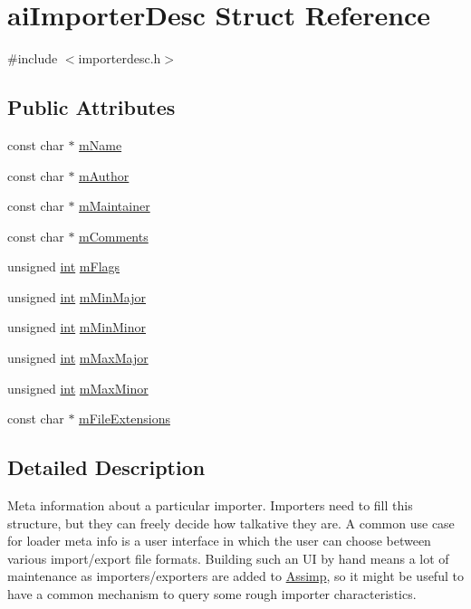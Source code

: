 \hypertarget{structai_importer_desc}{\section{ai\-Importer\-Desc Struct Reference}
\label{structai_importer_desc}
}


{\ttfamily \#include $<$importerdesc.\-h$>$}

\subsection*{Public Attributes}
\begin{DoxyCompactItemize}
\item 
const char $\ast$ \hyperlink{structai_importer_desc_a2a9d5fd818c01bba1a0a782722ab9495}{m\-Name}
\item 
const char $\ast$ \hyperlink{structai_importer_desc_a8e050453324b1e855701c7c082c1b24b}{m\-Author}
\item 
const char $\ast$ \hyperlink{structai_importer_desc_a53bf0ecb36ce0b97018b4b6bd2748f02}{m\-Maintainer}
\item 
const char $\ast$ \hyperlink{structai_importer_desc_a2d8ad562f6c18ee9e8bfdb2da4871118}{m\-Comments}
\item 
unsigned \hyperlink{_s_d_l__thread_8h_a6a64f9be4433e4de6e2f2f548cf3c08e}{int} \hyperlink{structai_importer_desc_a9939db58b9f95a537f9f5a749524b6b2}{m\-Flags}
\item 
unsigned \hyperlink{_s_d_l__thread_8h_a6a64f9be4433e4de6e2f2f548cf3c08e}{int} \hyperlink{structai_importer_desc_aee34d348f522807f0a36607664e92a57}{m\-Min\-Major}
\item 
unsigned \hyperlink{_s_d_l__thread_8h_a6a64f9be4433e4de6e2f2f548cf3c08e}{int} \hyperlink{structai_importer_desc_adb265dee32c6533234c45638df66ddab}{m\-Min\-Minor}
\item 
unsigned \hyperlink{_s_d_l__thread_8h_a6a64f9be4433e4de6e2f2f548cf3c08e}{int} \hyperlink{structai_importer_desc_a9d33eac3be20f7f4630f838a228ada63}{m\-Max\-Major}
\item 
unsigned \hyperlink{_s_d_l__thread_8h_a6a64f9be4433e4de6e2f2f548cf3c08e}{int} \hyperlink{structai_importer_desc_ae4c60eec7020af836b23537148f47f83}{m\-Max\-Minor}
\item 
const char $\ast$ \hyperlink{structai_importer_desc_a074bd688ffd15d7f4df32e794111a413}{m\-File\-Extensions}
\end{DoxyCompactItemize}


\subsection{Detailed Description}
Meta information about a particular importer. Importers need to fill this structure, but they can freely decide how talkative they are. A common use case for loader meta info is a user interface in which the user can choose between various import/export file formats. Building such an U\-I by hand means a lot of maintenance as importers/exporters are added to \hyperlink{namespace_assimp}{Assimp}, so it might be useful to have a common mechanism to query some rough importer characteristics. 

